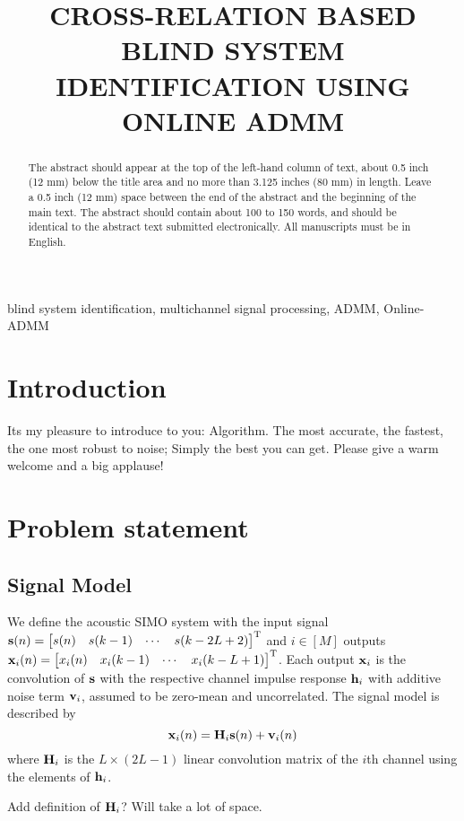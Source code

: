 \documentclass{article}
\title{CROSS-RELATION BASED BLIND SYSTEM IDENTIFICATION USING ONLINE ADMM}
\newcommand{\h}{\mtxb{h}}
\newcommand{\x}{\mtxb{x}}
\begin{document}
%
\maketitle
%
\begin{abstract}
The abstract should appear at the top of the left-hand column of text, about 0.5 inch (12 mm) below the title area and no more than 3.125 inches (80 mm) in length.
Leave a 0.5 inch (12 mm) space between the end of the abstract and the beginning of the main text.
The abstract should contain about 100 to 150 words, and should be identical to the abstract text submitted electronically.
All manuscripts must be in English.
\end{abstract}
%
\begin{keywords}
blind system identification, multichannel signal processing, ADMM, Online-ADMM
\end{keywords}
%
\section{Introduction}
\label{sec:intro}

Its my pleasure to introduce to you: Algorithm. The most accurate, the fastest, the one most robust to noise; Simply the best you can get. Please give a warm welcome and a big applause!


\section{Problem statement}
\label{sec:problem_statement}


\subsection{Signal Model}
\label{ssec:signal_model}
We define the acoustic SIMO system with the input signal \(\bm{\mathrm{s}}(n) = \begin{bmatrix}
    s(n)&s(k-1)&\cdots&s(k-2L+2)
\end{bmatrix}^{{\mathrm{T}}}\) and \(i \in [M]\) outputs 
\(
    \x_i(n) = \begin{bmatrix}
        x_i(n)&x_i(k-1)&\cdots&x_i(k-L+1)
    \end{bmatrix}^{\T}
\).
Each output \(\x_i\) is the convolution of \(\bm{\mathrm{s}}\) with the respective channel impulse response \(\h_i\) with additive noise term \(\bm{\mathrm{v}}_i\), assumed to be zero-mean and uncorrelated.
The signal model is described by
\begin{equation}
    \x_i(n) = \mtxb{H}_i \mtxb{s}(n) + \mtxb{v}_i(n)
\end{equation}
where \(\bm{\mathrm{H}}_i\) is the \(L \times (2L-1)\) linear convolution matrix of the \(i\)th channel using the elements of \(\h_i\).
\begin{note}
    Add definition of \(\bm{\mathrm{H}}_i\)? Will take a lot of space.
\end{note}
\end{document}
